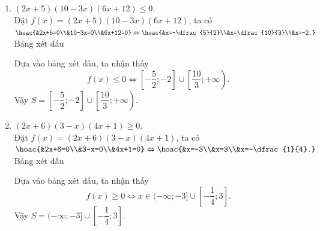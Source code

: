 \begin{bt}
{\begin{enumerate}
			\item $(2x+5)(10-3x)(6x+12)\le 0.$\\
			Đặt $f(x)=(2x+5)(10-3x)(6x+12)$, ta có $\hoac{&2x+5=0\\&10-3x=0\\&6x+12=0}\Leftrightarrow \hoac{&x=-\dfrac{5}{2}\\&x=\dfrac{10}{3}\\&x=-2.}$\\
			Bảng xét dấu
			\begin{center}
			\end{center} 
			Dựa vào bảng xét dấu, ta nhận thấy
			$$f(x)\le 0 \Leftrightarrow \left[-\dfrac{5}{2};-2\right]\cup \left[\dfrac{10}{3};+\infty \right). $$
			Vậy $S=\left[-\dfrac{5}{2};-2\right]\cup \left[\dfrac{10}{3};+\infty \right). $
			
			\item $(2x+6)(3-x)(4x+1)\ge 0.$\\
			Đặt $f(x)=(2x+6)(3-x)(4x+1)$, ta có $\hoac{&2x+6=0\\&3-x=0\\&4x+1=0}\Leftrightarrow \hoac{&x=-3\\&x=3\\&x=-\dfrac{1}{4}.}$\\
			Bảng xét dấu
			\begin{center}
			\end{center} 
			Dựa vào bảng xét dấu, ta nhận thấy
			$$f(x)\ge 0 \Leftrightarrow x\in (-\infty;-3]\cup \left[-\dfrac{1}{4};3\right]. $$
			Vậy $S=(-\infty;-3]\cup \left[-\dfrac{1}{4};3\right]. $
		\end{enumerate}
	}
\end{bt}

